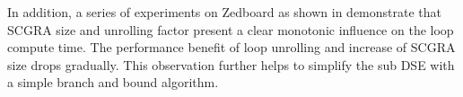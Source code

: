 

In addition, a series of experiments on Zedboard \cite{zedboard} as 
shown in  demonstrate that SCGRA size and 
unrolling factor present a clear monotonic influence on the 
loop compute time. The performance benefit of loop unrolling and 
increase of SCGRA size drops gradually. This observation further helps to simplify the sub DSE with
a simple branch and bound algorithm.



